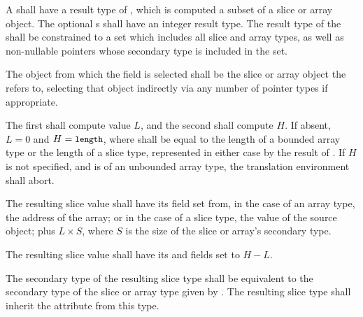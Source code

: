 \specsubsubitem
A  shall have a result type of
, which is computed a subset of a slice or array object.
The optional s shall have an integer result type. The
result type of the  shall be constrained to
a set which includes all slice and array types, as well as non-nullable pointers
whose secondary type is included in the set.


\specsubsubitem
The object from which the field is selected shall be the slice or array object
the  refers to, selecting that object indirectly
via any number of pointer types if appropriate.

\specsubsubitem
The first  shall compute value $L$, and the second shall
compute $H$. If absent, $L = 0$ and $H = \mbox{\textup{\small\texttt{length}}}$, where 
shall be equal to the length of a bounded array type or the length of a slice
type, represented in either case by the result of
. If $H$ is not specified, and
 is of an unbounded array type, the translation
environment shall abort.

\specsubsubitem
The resulting slice value shall have its  field set from, in the case
of an array type, the address of the array; or in the case of a slice type, the
 value of the source object; plus $L \times S$, where $S$ is the
size of the slice or array's secondary type.

\specsubsubitem
The resulting slice value shall have its  and 
fields set to $H - L$.

\specsubsubitem
The secondary type of the resulting slice type shall be equivalent to the
secondary type of the slice or array type given by
. The resulting slice type shall inherit the
 attribute from this type.


\begin{grammar}
 \\
	  \\
\end{grammar}

